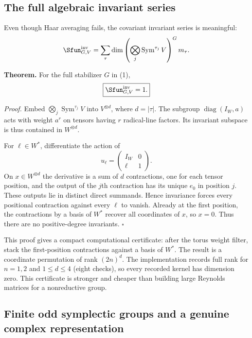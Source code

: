 \documentclass[10pt]{article}
\newcommand{\Sym}{\operatorname{Sym}}
\begin{document}
\subsection{The full algebraic invariant series}

Even though Haar averaging fails, the covariant invariant series is meaningful:
\begin{equation}
 \Sfun^{\mathrm{inv}}_{G,V}
 =\sum_\tau\dim\left(\bigotimes_j\Sym^{\tau_j}V\right)^Gm_\tau.
\end{equation}

\textbf{Theorem.} For the full stabilizer $G$ in (1),
\begin{equation}
 \boxed{\Sfun^{\mathrm{inv}}_{G,V}=1.}
\end{equation}

\textit{Proof.}
Embed $\bigotimes_j\Sym^{\tau_j}V$ into $V^{\otimes d}$, where
$d=|\tau|$. The subgroup $\operatorname{diag}(I_W,a)$ acts with weight $a^r$
on tensors having $r$ radical-line factors. Its invariant subspace is thus
contained in $W^{\otimes d}$.

For $\ell\in W^*$, differentiate the action of
\[
 u_\ell=\begin{pmatrix}I_W&0\\ \ell&1\end{pmatrix}.
\]
On $x\in W^{\otimes d}$ the derivative is a sum of $d$ contractions, one for
each tensor position, and the output of the $j$th contraction has its unique
$e_0$ in position $j$. These outputs lie in distinct direct summands. Hence
invariance forces every positional contraction against every $\ell$ to vanish.
Already at the first position, the contractions by a basis of $W^*$ recover
all coordinates of $x$, so $x=0$. Thus there are no positive-degree
invariants. \hfill$\square$

This proof gives a compact computational certificate: after the torus weight
filter, stack the first-position contractions against a basis of $W^*$. The
result is a coordinate permutation of rank $(2n)^d$. The implementation records
full rank for $n=1,2$ and $1\le d\le4$ (eight checks), so every recorded kernel
has dimension zero. This certificate is stronger and cheaper than building
large Reynolds matrices for a nonreductive group.

\subsection{Finite odd symplectic groups and a genuine complex representation}
\label{proctor-odd-symplectic-proof-and-verification:sec:finite}
\end{document}
